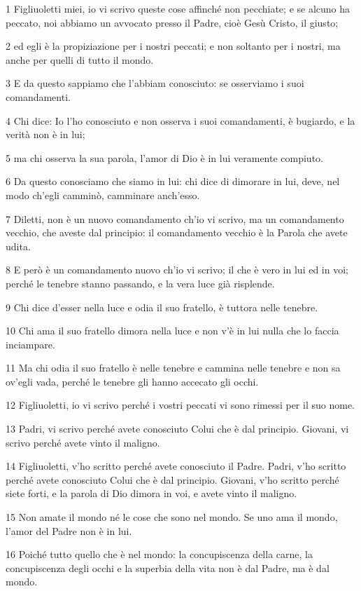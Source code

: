\par 1 Figliuoletti miei, io vi scrivo queste cose affinché non pecchiate; e se alcuno ha peccato, noi abbiamo un avvocato presso il Padre, cioè Gesù Cristo, il giusto;
\par 2 ed egli è la propiziazione per i nostri peccati; e non soltanto per i nostri, ma anche per quelli di tutto il mondo.
\par 3 E da questo sappiamo che l'abbiam conosciuto: se osserviamo i suoi comandamenti.
\par 4 Chi dice: Io l'ho conosciuto e non osserva i suoi comandamenti, è bugiardo, e la verità non è in lui;
\par 5 ma chi osserva la sua parola, l'amor di Dio è in lui veramente compiuto.
\par 6 Da questo conosciamo che siamo in lui: chi dice di dimorare in lui, deve, nel modo ch'egli camminò, camminare anch'esso.
\par 7 Diletti, non è un nuovo comandamento ch'io vi scrivo, ma un comandamento vecchio, che aveste dal principio: il comandamento vecchio è la Parola che avete udita.
\par 8 E però è un comandamento nuovo ch'io vi scrivo; il che è vero in lui ed in voi; perché le tenebre stanno passando, e la vera luce già risplende.
\par 9 Chi dice d'esser nella luce e odia il suo fratello, è tuttora nelle tenebre.
\par 10 Chi ama il suo fratello dimora nella luce e non v'è in lui nulla che lo faccia inciampare.
\par 11 Ma chi odia il suo fratello è nelle tenebre e cammina nelle tenebre e non sa ov'egli vada, perché le tenebre gli hanno accecato gli occhi.
\par 12 Figliuoletti, io vi scrivo perché i vostri peccati vi sono rimessi per il suo nome.
\par 13 Padri, vi scrivo perché avete conosciuto Colui che è dal principio. Giovani, vi scrivo perché avete vinto il maligno.
\par 14 Figliuoletti, v'ho scritto perché avete conosciuto il Padre. Padri, v'ho scritto perché avete conosciuto Colui che è dal principio. Giovani, v'ho scritto perché siete forti, e la parola di Dio dimora in voi, e avete vinto il maligno.
\par 15 Non amate il mondo né le cose che sono nel mondo. Se uno ama il mondo, l'amor del Padre non è in lui.
\par 16 Poiché tutto quello che è nel mondo: la concupiscenza della carne, la concupiscenza degli occhi e la superbia della vita non è dal Padre, ma è dal mondo.
